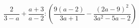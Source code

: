 \begin{ex}[type=expression]
	\begin{condition}
		\( \dfrac{2}{3-a}+\dfrac{a+3}{a-2}:\left( \dfrac{9(a-2)}{3a+1}-\dfrac{(2a-9)^2}{3a^2-5a-2} \right) \)
	\end{condition}
\end{ex}